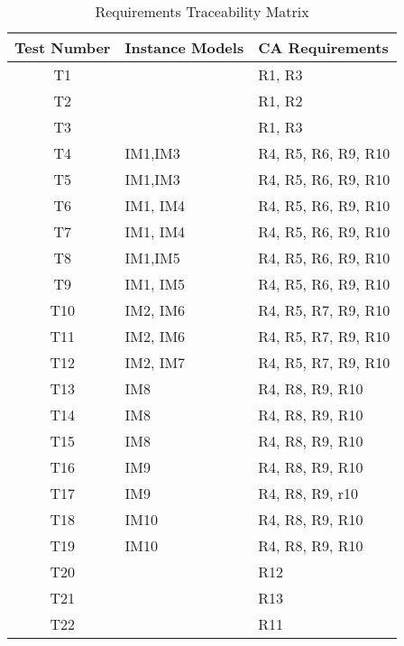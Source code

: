 \documentclass[12pt, titlepage]{article}
\begin{document}
\begin{table} [H]
	\caption{Requirements Traceability Matrix}
	\label{Table:Table_Traceability}  
	\begin{tabular}{|c|p{5cm}|p{5cm}|}
		\hline	
		\textbf{Test Number} & \textbf{Instance Models} & \textbf{CA Requirements}\\
		\hline 
		T1&         & R1, R3       \\ \hline
		T2&         & R1, R2       \\ \hline
		T3&         & R1, R3       \\ \hline
		
		T4& IM1,IM3 & R4, R5, R6, R9, R10   \\ \hline
		T5& IM1,IM3& R4, R5, R6, R9, R10   \\ \hline
		
		T6& IM1, IM4& R4, R5, R6, R9, R10   \\ \hline
		T7& IM1, IM4& R4, R5, R6, R9, R10   \\ \hline
		
		T8& IM1,IM5& R4, R5, R6, R9, R10   \\ \hline
		T9& IM1, IM5& R4, R5, R6, R9, R10   \\ \hline
		
		
		T10& IM2, IM6& R4, R5, R7, R9, R10     \\ \hline
		T11& IM2, IM6& R4, R5, R7, R9, R10     \\ \hline
		
		
		T12& IM2, IM7& R4, R5, R7, R9, R10     \\ \hline
		
		
		T13& IM8     & R4, R8, R9, R10  \\ \hline
		T14& IM8     & R4, R8, R9, R10  \\ \hline
		T15& IM8     & R4, R8, R9, R10  \\ \hline
		
		
		T16& IM9     & R4, R8, R9, R10    \\ \hline
		T17& IM9     & R4, R8, R9, r10     \\ \hline
		
		T18& IM10    & R4, R8, R9, R10    \\ \hline
		T19& IM10    & R4, R8, R9, R10    \\ \hline
		
		T20&         & R12\\ \hline
		T21&         & R13\\ \hline
		T22&         & R11\\ \hline
		
	\end{tabular}\\
\end{table}
\end{document}
